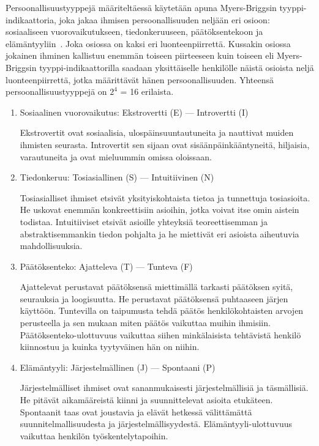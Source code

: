 \documentclass[finnish]{../tktltiki2}
\theoremstyle{definition}
\theoremstyle{remark}
\begin{document}
Persoonallisuustyyppejä määriteltäessä käytetään apuna
Myers-Briggsin tyyppi-indikaattoria, joka jakaa ihmisen persoonallisuuden neljään eri osioon: sosiaaliseen vuorovaikutukseen, tiedonkeruuseen, päätöksentekoon ja elämän\-tyyliin~\cite{Capretz:2003:PTS:766407.766410,Capretz:2010:MSS:1726559.1726574,DaCunha:2007:PMA:1230819.1241672}. Joka osiossa on
kaksi eri luonteenpiirrettä. Kussakin osiossa jokainen ihminen kallistuu enemmän toiseen piirteeseen kuin toiseen eli Myers-Briggsin
tyyppi-indikaattorilla saadaan yksittäiselle henkilölle näistä osioista neljä luonteenpiirrettä, jotka määrittävät hänen persoonallisuuden. Yhteensä
persoonallisuustyyppejä on $2^4$ = 16 erilaista.

\begin{enumerate}

\item Sosiaalinen vuorovaikutus: Ekstrovertti (E) --- Introvertti (I)

Ekstrovertit ovat sosiaalisia, ulospäinsuuntautuneita ja nauttivat
muiden ihmisten seurasta. Introvertit sen sijaan ovat sisäänpäinkääntyneitä, hiljaisia, varautuneita ja ovat mieluummin omissa oloissaan.

\item Tiedonkeruu: Tosiasiallinen (S) --- Intuitiivinen (N)

Tosiasialliset ihmiset etsivät yksityiskohtaista tietoa ja tunnettuja
tosiasioita. He uskovat enemmän konkreettisiin asioihin, jotka
voivat itse omin aistein todistaa. Intuitiiviset etsivät asioille
yhteyksiä teoreettisemman ja abstraktisemmankin tiedon pohjalta ja
he miettivät eri asioista aiheutuvia mahdollisuuksia.

\item Päätöksenteko: Ajatteleva (T) --- Tunteva (F)

Ajattelevat perustavat päätöksensä miettimällä tarkasti päätöksen syitä, seurauksia ja loogisuutta. He perustavat päätöksensä puhtaaseen järjen käyttöön. Tuntevilla on taipumusta tehdä päätös
henkilökohtaisten arvojen perusteella ja sen mukaan miten päätös
vaikuttaa muihin ihmisiin. Päätöksenteko-ulottuvuus vaikuttaa siihen minkälaisista tehtävistä
henkilö kiinnostuu ja kuinka tyytyväinen hän on niihin.

\item Elämäntyyli: Järjestelmällinen (J) --- Spontaani (P)

Järjestelmälliset ihmiset ovat sananmukaisesti järjestelmällisiä
ja täsmäl\-lisiä. He pitävät aikamääreistä kiinni ja suunnittelevat
asioita etukäteen. Spontaanit taas ovat joustavia ja elävät
hetkessä välittämättä suunnitelmallisuudesta ja järjestelmällisyydestä.
Elämäntyyli-ulottuvuus vaikuttaa henkilön työskentelytapoihin.

\end{enumerate}
\end{document}
